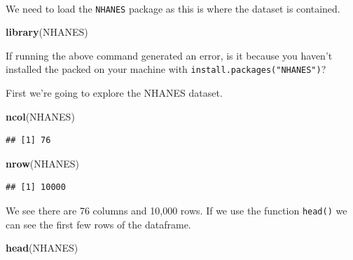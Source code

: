 \documentclass[
]{book}
\newenvironment{Shaded}{\begin{snugshade}}{\end{snugshade}}
\newcommand{\FunctionTok}[1]{\textcolor[rgb]{0.13,0.29,0.53}{\textbf{#1}}}
\newcommand{\NormalTok}[1]{#1}
\begin{document}
~~

We need to load the \texttt{NHANES} package as this is where the dataset is contained.

\begin{Shaded}
\begin{Highlighting}[]
\FunctionTok{library}\NormalTok{(NHANES)}
\end{Highlighting}
\end{Shaded}

If running the above command generated an error, is it because you haven't installed the packed on your machine with \texttt{install.packages("NHANES")}?

First we're going to explore the NHANES dataset.

\begin{Shaded}
\begin{Highlighting}[]
\FunctionTok{ncol}\NormalTok{(NHANES)}
\end{Highlighting}
\end{Shaded}

\begin{verbatim}
## [1] 76
\end{verbatim}

\begin{Shaded}
\begin{Highlighting}[]
\FunctionTok{nrow}\NormalTok{(NHANES)}
\end{Highlighting}
\end{Shaded}

\begin{verbatim}
## [1] 10000
\end{verbatim}

We see there are 76 columns and 10,000 rows. If we use the function \texttt{head()} we can see the first few rows of the dataframe.

\begin{Shaded}
\begin{Highlighting}[]
\FunctionTok{head}\NormalTok{(NHANES)}
\end{Highlighting}
\end{Shaded}
\end{document}
